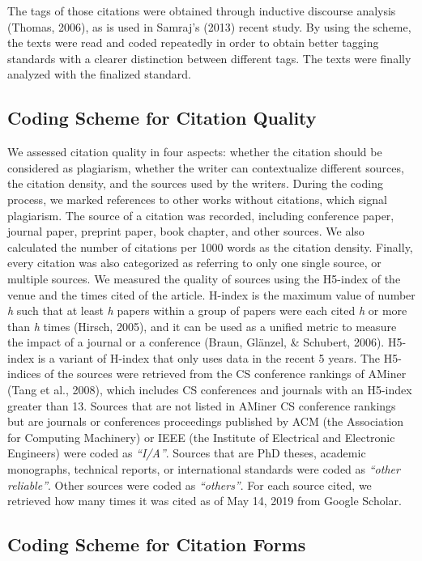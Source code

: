 The tags of those citations were obtained through inductive discourse analysis (Thomas, 2006), as is used in Samraj's (2013) recent study. By using the scheme, the texts were read and coded repeatedly in order to obtain better tagging standards with a clearer distinction between different tags. The texts were finally analyzed with the finalized standard.

\subsection{Coding Scheme for Citation Quality}
We assessed citation quality in four aspects: whether the citation should be considered as plagiarism, whether the writer can contextualize different sources, the citation density, and the sources used by the writers. During the coding process, we marked references to other works without citations, which signal plagiarism. The source of a citation was recorded, including conference paper, journal paper, preprint paper, book chapter, and other sources. We also calculated the number of citations per 1000 words as the citation density. Finally, every citation was also categorized as referring to only one single source, or multiple sources.
We measured the quality of sources using the H5-index of the venue and the times cited of the article. H-index is the maximum value of number \textit{h} such that at least \textit{h} papers within a group of papers were each cited \textit{h} or more than \textit{h} times (Hirsch, 2005), and it can be used as a unified metric to measure the impact of a journal or a conference (Braun, Glänzel, \& Schubert, 2006). H5-index is a variant of H-index that only uses data in the recent 5 years. The H5-indices of the sources were retrieved from the CS conference rankings of AMiner (Tang et al., 2008), which includes CS conferences and journals with an H5-index greater than 13. Sources that are not listed in AMiner CS conference rankings but are journals or conferences proceedings published by ACM (the Association for Computing Machinery) or IEEE (the Institute of Electrical and Electronic Engineers) were coded as \textit{“I/A”}. Sources that are PhD theses, academic monographs, technical reports, or international standards were coded as \textit{“other reliable”}. Other sources were coded as \textit{“others”}. For each source cited, we retrieved how many times it was cited as of May 14, 2019 from Google Scholar.

\subsection{Coding Scheme for Citation Forms}

